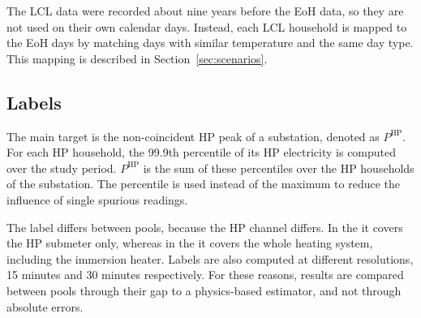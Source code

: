 The LCL data were recorded about nine years before the EoH data, so they are not used on their own calendar days. Instead, each LCL household is mapped to the EoH days by matching days with similar temperature and the same day type. This mapping is described in Section~\ref{sec:scenarios}.

\subsection{Labels}\label{sec:data-labels}

The main target is the non-coincident HP peak of a substation, denoted as $P^{\mathrm{HP}}$. For each HP household, the 99.9th percentile of its HP electricity is computed over the study period. $P^{\mathrm{HP}}$ is the sum of these percentiles over the HP households of the substation. The percentile is used instead of the maximum to reduce the influence of single spurious readings.

The label differs between pools, because the HP channel differs. In the \poolCH{} it covers the HP submeter only, whereas in the \poolGB{} it covers the whole heating system, including the immersion heater. Labels are also computed at different resolutions, 15 minutes and 30 minutes respectively. For these reasons, results are compared between pools through their gap to a physics-based estimator, and not through absolute errors.
